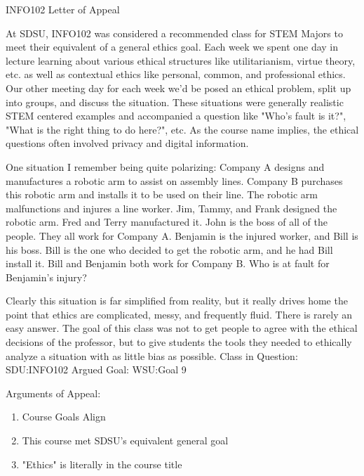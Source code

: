 \documentclass{article}
\begin{document}
\begin{center}
	INFO102 Letter of Appeal
\end{center}

At SDSU, INFO102 was considered a recommended class for STEM Majors to meet their equivalent of a general ethics goal. Each week we spent one day in lecture learning about various ethical structures like utilitarianism, virtue theory, etc. as well as contextual ethics like personal, common, and professional ethics. Our other meeting day for each week we'd be posed an ethical problem, split up into groups, and discuss the situation. These situations were generally realistic STEM centered examples and accompanied a question like "Who's fault is it?", "What is the right thing to do here?", etc. As the course name implies, the ethical questions often involved privacy and digital information.

One situation I remember being quite polarizing: Company A designs and manufactures a robotic arm to assist on assembly lines. Company B purchases this robotic arm and installs it to be used on their line. The robotic arm malfunctions and injures a line worker. Jim, Tammy, and Frank designed the robotic arm. Fred and Terry manufactured it. John is the boss of all of the people. They all work for Company A. Benjamin is the injured worker, and Bill is his boss. Bill is the one who decided to get the robotic arm, and he had Bill install it. Bill and Benjamin both work for Company B. Who is at fault for Benjamin's injury?

Clearly this situation is far simplified from reality, but it really drives home the point that ethics are complicated, messy, and frequently fluid. There is rarely an easy answer. The goal of this class was not to get people to agree with the ethical decisions of the professor, but to give students the tools they needed to ethically analyze a situation with as little bias as possible.
\newline
Class in Question: SDU:INFO102
\newline
Argued Goal: WSU:Goal 9

Arguments of Appeal:
\begin{enumerate}
	\item Course Goals Align
	\item This course met SDSU's equivalent general goal
	\item "Ethics" is literally in the course title
\end{enumerate}

\end{document}
